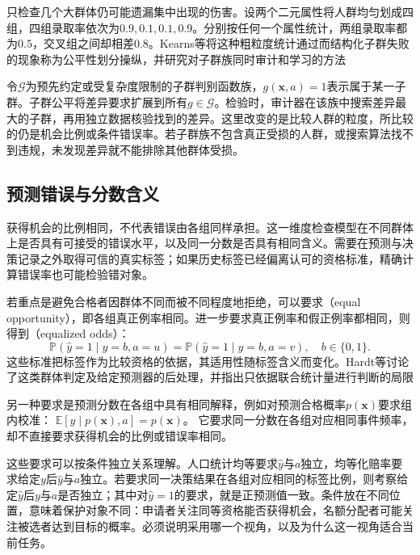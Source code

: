 只检查几个大群体仍可能遗漏集中出现的伤害。设两个二元属性将人群均匀划成四组，四组录取率依次为$0.9,0.1,0.1,0.9$。分别按任何一个属性统计，两组录取率都为$0.5$，交叉组之间却相差$0.8$。Kearns等将这种粗粒度统计通过而结构化子群失败的现象称为公平性划分操纵，并研究对子群族同时审计和学习的方法

令$\mathcal G$为预先约定或受复杂度限制的子群判别函数族，$g(\bm{x},a)=1$表示属于某一子群。子群公平将差异要求扩展到所有$g\in\mathcal G$。检验时，审计器在该族中搜索差异最大的子群，再用独立数据核验找到的差异。这里改变的是比较人群的粒度，所比较的仍是机会比例或条件错误率。若子群族不包含真正受损的人群，或搜索算法找不到违规，未发现差异就不能排除其他群体受损。

\subsection{预测错误与分数含义}
\label{sec:fairness-prediction-comparison}

获得机会的比例相同，不代表错误由各组同样承担。这一维度检查模型在不同群体上是否具有可接受的错误水平，以及同一分数是否具有相同含义。需要在预测与决策记录之外取得可信的真实标签；如果历史标签已经偏离认可的资格标准，精确计算错误率也可能检验错对象。

若重点是避免合格者因群体不同而被不同程度地拒绝，可以要求（equal opportunity），即各组真正例率相同。进一步要求真正例率和假正例率都相同，则得到（equalized odds）：
\begin{equation}
 \mathbb P(\hat y=1\mid y=b,a=u)
 =\mathbb P(\hat y=1\mid y=b,a=v),
 \quad b\in\{0,1\}.
 \label{eq:fairness-equalized-odds}
\end{equation}
这些标准把标签作为比较资格的依据，其适用性随标签含义而变化。Hardt等讨论了这类群体判定及给定预测器的后处理，并指出只依据联合统计量进行判断的局限

另一种要求是预测分数在各组中具有相同解释，例如对预测合格概率$p(\bm{x})$要求组内校准：
$\mathbb E[y\mid p(\bm{x}),a]=p(\bm{x})$。
它要求同一分数在各组对应相同事件频率，却不直接要求获得机会的比例或错误率相同。

这些要求可以按条件独立关系理解。人口统计均等要求$\hat y$与$a$独立，均等化赔率要求给定$y$后$\hat y$与$a$独立。若要求同一决策结果在各组对应相同的标签比例，则考察给定$\hat y$后$y$与$a$是否独立；其中对$\hat y=1$的要求，就是正预测值一致。条件放在不同位置，意味着保护对象不同：申请者关注同等资格能否获得机会，名额分配者可能关注被选者达到目标的概率。必须说明采用哪一个视角，以及为什么这一视角适合当前任务。

